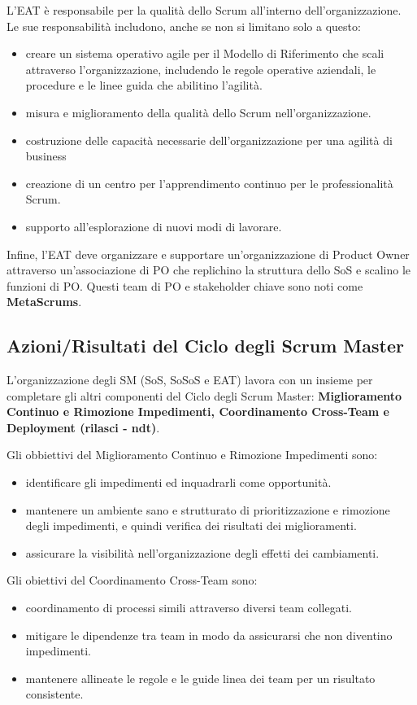 \documentclass[italian,12pt,a4paper,parskip=full]{scrartcl}
\begin{document}
L'EAT è responsabile per la qualità dello Scrum all'interno dell'organizzazione.
Le sue responsabilità includono, anche se non si limitano solo a questo:
\begin{itemize}
\item creare un sistema operativo agile per il Modello di Riferimento che scali attraverso l'organizzazione, includendo le regole operative aziendali, le procedure e le linee guida che abilitino l'agilità.
\item misura e miglioramento della qualità dello Scrum nell'organizzazione.
\item costruzione delle capacità necessarie dell'organizzazione per una agilità di business 
\item creazione di un centro per l'apprendimento continuo per le professionalità Scrum.
\item supporto all'esplorazione di nuovi modi di lavorare.
\end{itemize}
Infine, l'EAT deve organizzare e supportare un'organizzazione di Product Owner attraverso un'associazione di PO che replichino la struttura dello SoS e scalino le funzioni di PO. Questi team di PO e stakeholder chiave sono noti come  \textbf{MetaScrums}.

\subsection{Azioni/Risultati del Ciclo degli Scrum Master}
L'organizzazione degli SM (SoS, SoSoS e EAT) lavora con un insieme per completare gli altri componenti del Ciclo degli Scrum Master: \textbf{Miglioramento Continuo e
 Rimozione Impedimenti, Coordinamento Cross-Team e Deployment (rilasci - ndt)}.

Gli obbiettivi del Miglioramento Continuo e Rimozione Impedimenti sono:
\begin{itemize}
\item identificare gli impedimenti ed inquadrarli come opportunità.
\item mantenere un ambiente sano e strutturato di prioritizzazione e rimozione degli impedimenti, e quindi verifica dei risultati dei miglioramenti.
\item assicurare la visibilità nell'organizzazione degli effetti dei cambiamenti.
\end{itemize}

Gli obiettivi del Coordinamento Cross-Team sono:
\begin{itemize}
\item coordinamento di processi simili attraverso diversi team collegati.
\item mitigare le dipendenze tra team in modo da assicurarsi che non diventino impedimenti.
\item mantenere allineate le regole e le guide linea dei team per un risultato consistente.
\end{itemize}
\end{document}
